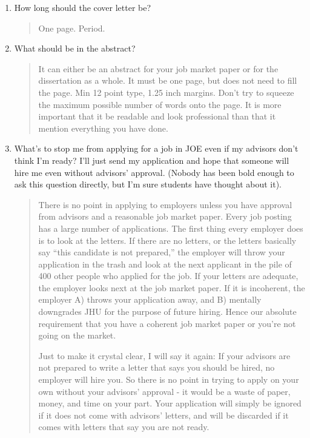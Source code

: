 \documentclass{\classes/econtex}
\begin{document}
\begin{enumerate}
\begin{quote}
  \end{quote}

\item  How long should the cover letter be?
  \begin{quote}
    One page.  Period.

  \end{quote}

\item  What should be in the abstract?
  \begin{quote}
    It can either be an abstract for your job market paper or for the dissertation 
    as a whole.  It must be one page, but does not need to fill the page.  Min 12 point
    type, 1.25 inch margins.  Don't try to squeeze the maximum possible number of words onto
    the page.  It is more important that it be readable and look professional than that 
    it mention everything you have done.

  \end{quote}

\item  What's to stop me from applying for a job in JOE even if my advisors don't think I'm ready?  I'll just send my application and hope that someone will hire me even without advisors' approval.  (Nobody has been bold enough to ask this question directly, but I'm sure students have thought about it).

  \begin{quote}
    There is no point in applying to employers unless you have approval from advisors and a reasonable job market paper.  Every job posting has a large number of applications.  The first thing every employer does is to look at the letters.  If there are no letters, or the letters basically say ``this candidate is not prepared,'' the employer will throw your application in the trash and look at the next applicant in the pile of 400 other people who applied for the job.  If your letters are adequate, the employer looks next at the job market paper.  If it is incoherent, the employer A) throws your application away, and B) mentally downgrades JHU for the purpose of future hiring.  Hence our absolute requirement that you have a coherent job market paper or you're not going on the market.

    Just to make it crystal clear, I will say it again: If your advisors
    are not prepared to write a letter that says you should be hired, no
    employer will hire you.  So there is no point in trying to apply on
    your own without your advisors' approval - it would be a waste of
    paper, money, and time on your part.  Your application will simply be
    ignored if it does not come with advisors' letters, and will be discarded
    if it comes with letters that say you are not ready.


\end{quote}
\end{enumerate}
\end{document}

